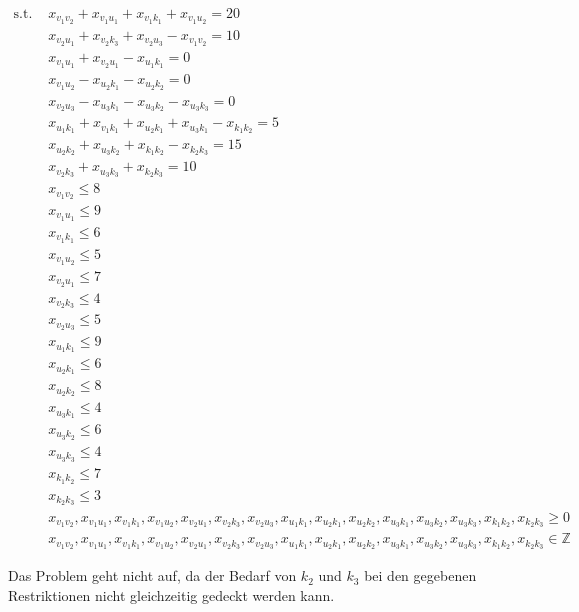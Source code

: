 \documentclass[a4paper,11pt]{article}
\begin{document}
\begin{align*}
\text{s.t. }
& x_{v_1 v_2} + x_{v_1 u_1} + x_{v_1 k_1} + x_{v_1 u_2} = 20 \\ %
& x_{v_2 u_1} + x_{v_2 k_3} + x_{v_2 u_3} - x_{v_1 v_2} = 10 \\ %
& x_{v_1 u_1} + x_{v_2 u_1} - x_{u_1 k_1} = 0 \\ %
& x_{v_1 u_2} - x_{u_2 k_1} - x_{u_2 k_2} = 0 \\ %
& x_{v_2 u_3} - x_{u_3 k_1} - x_{u_3 k_2} - x_{u_3 k_3} = 0 \\ %
& x_{u_1 k_1} + x_{v_1 k_1} + x_{u_2 k_1} + x_{u_3 k_1} - x_{k_1 k_2} = 5 \\ %
& x_{u_2 k_2} + x_{u_3 k_2} + x_{k_1 k_2} - x_{k_2 k_3} = 15 \\ %
& x_{v_2 k_3} + x_{u_3 k_3} + x_{k_2 k_3} = 10 \\ %
& x_{v_1 v_2} \le 8 \\ %
& x_{v_1 u_1} \le 9 \\ %
& x_{v_1 k_1} \le 6 \\ %
& x_{v_1 u_2} \le 5 \\ %
& x_{v_2 u_1} \le 7 \\ %
& x_{v_2 k_3} \le 4 \\ %
& x_{v_2 u_3} \le 5 \\ %
& x_{u_1 k_1} \le 9 \\ %
& x_{u_2 k_1} \le 6 \\ %
& x_{u_2 k_2} \le 8 \\ %
& x_{u_3 k_1} \le 4 \\ %
& x_{u_3 k_2} \le 6 \\ %
& x_{u_3 k_3} \le 4 \\ %
& x_{k_1 k_2} \le 7 \\ %
& x_{k_2 k_3} \le 3 \\ %
& x_{v_1 v_2},
  x_{v_1 u_1},
  x_{v_1 k_1},
  x_{v_1 u_2},
  x_{v_2 u_1},
  x_{v_2 k_3},
  x_{v_2 u_3},
  x_{u_1 k_1},
  x_{u_2 k_1},
  x_{u_2 k_2},
  x_{u_3 k_1},
  x_{u_3 k_2},
  x_{u_3 k_3},
  x_{k_1 k_2},
  x_{k_2 k_3} \ge 0 \\ %
& x_{v_1 v_2},
  x_{v_1 u_1},
  x_{v_1 k_1},
  x_{v_1 u_2},
  x_{v_2 u_1},
  x_{v_2 k_3},
  x_{v_2 u_3},
  x_{u_1 k_1},
  x_{u_2 k_1},
  x_{u_2 k_2},
  x_{u_3 k_1},
  x_{u_3 k_2},
  x_{u_3 k_3},
  x_{k_1 k_2},
  x_{k_2 k_3} \in \mathbb{Z} %
\end{align*}

\vspace{4mm}

Das Problem geht nicht auf, da der Bedarf von $k_2$ und $k_3$ bei den gegebenen Restriktionen nicht gleichzeitig gedeckt werden kann.
\end{document}
